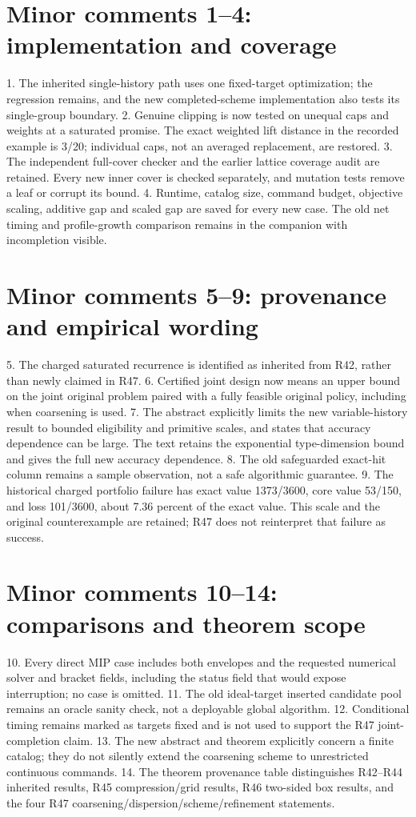 \documentclass[11pt]{article}
\begin{document}
\section*{Minor comments 1--4: implementation and coverage}
1. The inherited single-history path uses one fixed-target optimization; the regression remains, and the new completed-scheme implementation also tests its single-group boundary. 2. Genuine clipping is now tested on unequal caps and weights at a saturated promise. The exact weighted lift distance in the recorded example is 3/20; individual caps, not an averaged replacement, are restored. 3. The independent full-cover checker and the earlier lattice coverage audit are retained. Every new inner cover is checked separately, and mutation tests remove a leaf or corrupt its bound. 4. Runtime, catalog size, command budget, objective scaling, additive gap and scaled gap are saved for every new case. The old net timing and profile-growth comparison remains in the companion with incompletion visible.

\section*{Minor comments 5--9: provenance and empirical wording}
5. The charged saturated recurrence is identified as inherited from R42, rather than newly claimed in R47. 6. Certified joint design now means an upper bound on the joint original problem paired with a fully feasible original policy, including when coarsening is used. 7. The abstract explicitly limits the new variable-history result to bounded eligibility and primitive scales, and states that accuracy dependence can be large. The text retains the exponential type-dimension bound and gives the full new accuracy dependence. 8. The old safeguarded exact-hit column remains a sample observation, not a safe algorithmic guarantee. 9. The historical charged portfolio failure has exact value 1373/3600, core value 53/150, and loss 101/3600, about 7.36 percent of the exact value. This scale and the original counterexample are retained; R47 does not reinterpret that failure as success.

\section*{Minor comments 10--14: comparisons and theorem scope}
10. Every direct MIP case includes both envelopes and the requested numerical solver and bracket fields, including the status field that would expose interruption; no case is omitted. 11. The old ideal-target inserted candidate pool remains an oracle sanity check, not a deployable global algorithm. 12. Conditional timing remains marked as targets fixed and is not used to support the R47 joint-completion claim. 13. The new abstract and theorem explicitly concern a finite catalog; they do not silently extend the coarsening scheme to unrestricted continuous commands. 14. The theorem provenance table distinguishes R42--R44 inherited results, R45 compression/grid results, R46 two-sided box results, and the four R47 coarsening/dispersion/scheme/refinement statements.
\end{document}
